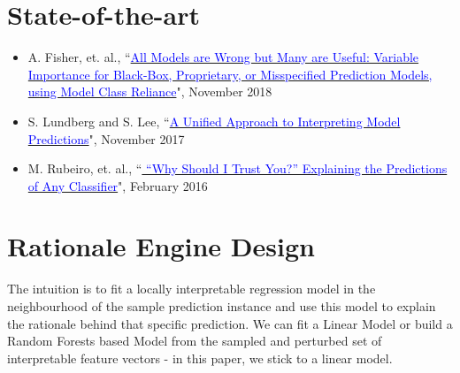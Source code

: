 \documentclass{article}
\begin{document}
\section{State-of-the-art}
\begin{itemize}
    \item A. Fisher, et. al., ``\href{https://arxiv.org/pdf/1801.01489.pdf}{\textcolor{blue}{All Models are Wrong but Many are Useful: Variable Importance for Black-Box, Proprietary, or Misspecified Prediction Models, using Model Class Reliance}}", November 2018
    \item S. Lundberg and S. Lee, ``\href{https://arxiv.org/pdf/1705.07874.pdf}{\textcolor{blue}{A Unified Approach to Interpreting Model Predictions}}", November 2017
    \item M. Rubeiro, et. al., ``\href{https://www.kdd.org/kdd2016/papers/files/rfp0573-ribeiroA.pdf}{\textcolor{blue}{ “Why Should I Trust You?” Explaining the Predictions of Any Classifier}}", February 2016
\end{itemize}
\section{Rationale Engine Design}
The intuition is to fit a locally interpretable regression model in the neighbourhood of the sample prediction instance and use this model to explain the rationale behind that specific prediction. We can fit a Linear Model or build a Random Forests based Model from the sampled and perturbed set of interpretable feature vectors - in this paper, we stick to a linear model.
\end{document}
